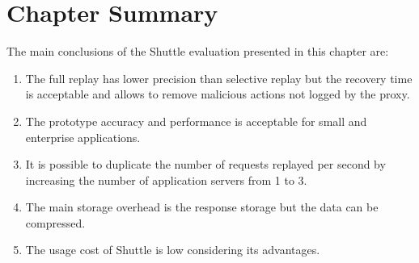\section{Chapter Summary}\label{sec:eval:performance:summary}
The main conclusions of the Shuttle evaluation presented in this chapter are:
\begin{enumerate}
  \item The full replay has lower precision than selective replay but the recovery time is acceptable and allows to remove malicious actions not logged by the proxy.
  \item The prototype accuracy and performance is acceptable for small and enterprise applications.
  \item It is possible to duplicate the number of requests replayed per second by increasing the number of application servers from 1 to 3. 
  \item The main storage overhead is the response storage but the data can be compressed. 
  \item The usage cost of Shuttle is low considering its advantages.
\end{enumerate}          







